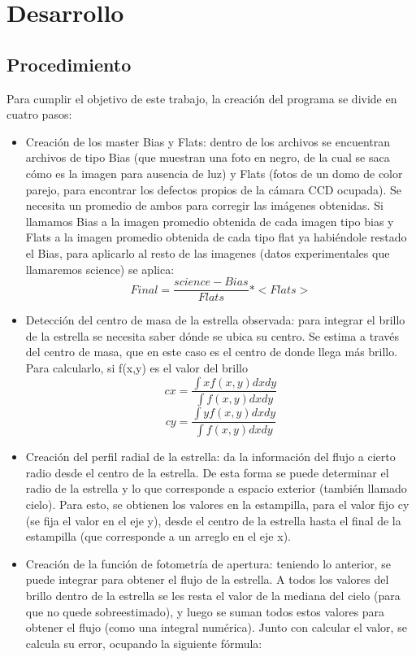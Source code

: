 \documentclass[a4paper, 11pt, spanish]{article}
\begin{document}
\section{Desarrollo}
\subsection{Procedimiento}

Para cumplir el objetivo de este trabajo, la creaci\'on del programa se divide en cuatro pasos:

\begin{itemize}
	\item Creaci\'on de los master Bias y Flats: dentro de los archivos se encuentran archivos de tipo Bias (que muestran una foto en negro, de la cual se saca c\'omo es la imagen para ausencia de luz) y Flats (fotos de un domo de color parejo, para encontrar los defectos propios de la c\'amara CCD ocupada). Se necesita un promedio de ambos para corregir las im\'agenes obtenidas. Si llamamos Bias a la imagen promedio obtenida de cada imagen tipo bias y Flats a la imagen promedio obtenida de cada tipo flat ya habi\'endole restado el Bias, para aplicarlo al resto de las imagenes (datos experimentales que llamaremos science) se aplica:
	\begin{equation*}
	Final = \frac{science - Bias}{Flats} * <Flats>
	\end{equation*}
	\item Detecci\'on del centro de masa de la estrella observada: para integrar el brillo de la estrella se necesita saber d\'onde se ubica su centro. Se estima a trav\'es del centro de masa, que en este caso es el centro de donde llega m\'as brillo. Para calcularlo, si f(x,y) es el valor del brillo 
	\begin{equation*}
	cx = \frac{\int xf(x,y) dx dy}{\int f(x,y) dx dy}
	\end{equation*}
	\begin{equation*}
	cy = \frac{\int yf(x,y) dx dy}{\int f(x,y) dx dy}
	\end{equation*}
	\item Creaci\'on del perfil radial de la estrella: da la informaci\'on del flujo a cierto radio desde el centro de la estrella. De esta forma se puede determinar el radio de la estrella y lo que corresponde a espacio exterior (tambi\'en llamado cielo). Para esto, se obtienen los valores en la estampilla, para el valor fijo cy (se fija el valor en el eje y), desde el centro de la estrella hasta el final de la estampilla (que corresponde a un arreglo en el eje x). 
	\item Creaci\'on de la funci\'on de fotometr\'ia de apertura: teniendo lo anterior, se puede integrar para obtener el flujo de la estrella. A todos los valores del brillo dentro de la estrella se les resta el valor de la mediana del cielo (para que no quede sobreestimado), y luego se suman todos estos valores para obtener el flujo (como una integral num\'erica). Junto con calcular el valor, se calcula su error, ocupando la siguiente f\'ormula:
	

\end{itemize}
\end{document}
